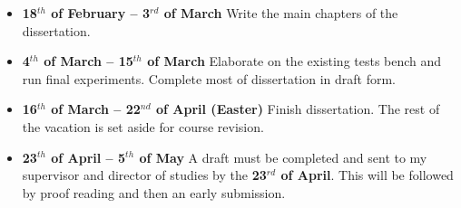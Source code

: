 \begin{itemize}
\item \textbf{18$^{th}$ of February -- 3$^{rd}$ of March} Write the main
chapters of the dissertation.

\item \textbf{4$^{th}$ of March -- 15$^{th}$ of March} Elaborate on the
existing tests bench and run final experiments.  Complete most of dissertation
in draft form.

\item \textbf{16$^{th}$ of March -- 22$^{nd}$ of April (Easter)} Finish
dissertation. The rest of the vacation is set aside for course revision.

\item \textbf{23$^{th}$ of April -- 5$^{th}$ of May} A draft must be completed
and sent to my supervisor and director of studies by the \textbf{23$^{rd}$ of
April}.  This will be followed by proof reading and then an early submission.

\end{itemize}
